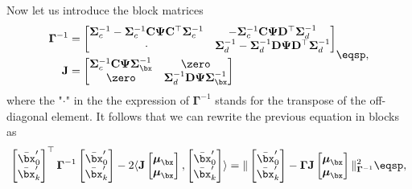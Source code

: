 Now let us introduce the block matrices
\begin{equation*}
    \begin{aligned}
        \mathbf{\Gamma}^{-1} & = \begin{bmatrix}
            \covzero^{-1} - \covzero^{-1} \matzero \covthree \matzero^\top \covzero^{-1} &  -\covzero^{-1} \matzero \covthree \matk^\top \covk^{-1} \\
            \cdot & \covk^{-1} - \covk^{-1} \matk \covthree \matk^\top \covk^{-1}
        \end{bmatrix}
        \\
        \mathbf{J} & = \begin{bmatrix}
            \covzero^{-1} \matzero \covthree \covtau^{-1} & \zero \\
            \zero &  \covk^{-1} \matk \covthree \covtau^{-1} 
        \end{bmatrix}
    \end{aligned}
    \eqsp,
\end{equation*}
where the "$\cdot$" in the the expression of $\mathbf{\Gamma}^{-1}$ stands for the transpose of the off-diagonal element.
It follows that we can rewrite the previous equation in blocks as
\begin{align*}
    \begin{bmatrix}\centeredxzero \\ \centeredxk \end{bmatrix}^\top
    \mathbf{\Gamma}^{-1}
    \begin{bmatrix}\centeredxzero \\ \centeredxk \end{bmatrix}
    - 2 \langle
        \mathbf{J} \begin{bmatrix}\meantau \\ \meantau \end{bmatrix}
        ,
        \begin{bmatrix}\centeredxzero \\ \centeredxk \end{bmatrix}
    \rangle
    = 
    \| 
        \begin{bmatrix}\centeredxzero \\ \centeredxk \end{bmatrix} 
        -
        \mathbf{\Gamma} \mathbf{J} \begin{bmatrix}\meantau \\ \meantau \end{bmatrix}
    \|_{\mathbf{\Gamma}^{-1}}^2
    \eqsp,
\end{align*}
